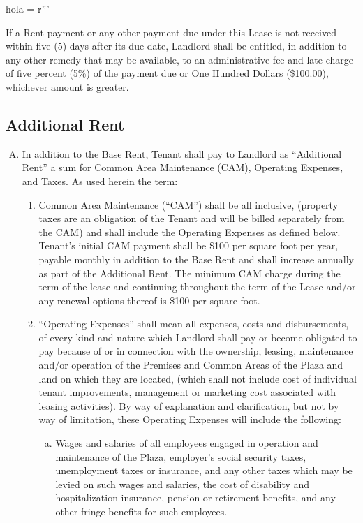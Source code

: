 hola = r'''\documentclass{article}
\newcommand{\cam}{\$100}
\begin{document}
    If a Rent payment or any other payment due under this Lease is not received within five (5) days after its due date, Landlord shall be entitled, in addition to any other remedy that may be available, to an administrative fee and late charge of five percent (5\%) of the payment due or One Hundred Dollars (\$100.00), whichever amount is greater.
    
\subsection*{Additional Rent}

    \begin{enumerate}[(A)]
        \item \label{Subsection 3A}In addition to the Base Rent, Tenant shall pay to Landlord as ``Additional Rent'' a sum for Common Area Maintenance (CAM), Operating Expenses, and Taxes.   As used herein the term:

         \begin{enumerate}[I]
         \item Common Area Maintenance (``CAM'') shall be all inclusive, (property taxes are an obligation of the Tenant and will be billed separately from the CAM) and shall include the Operating Expenses as defined below.  Tenant’s initial CAM payment shall be \cam{} per square foot per year, payable monthly in addition to the Base Rent and shall increase annually as part of the Additional Rent. The minimum CAM charge during the term of the lease and continuing throughout the term of the Lease and/or any renewal options thereof is \cam{} per square foot.

        \item ``Operating Expenses'' shall mean all expenses, costs and disbursements, of every kind and nature which Landlord shall pay or become obligated to pay because of or in connection with the ownership, leasing, maintenance and/or operation of the Premises and Common Areas of the Plaza and land on which they are located, (which shall not include cost of individual tenant improvements, management or marketing cost associated with leasing activities). By way of explanation and clarification, but not by way of limitation, these Operating Expenses will include the following:

        
        \begin{enumerate}[(a)]
        \item Wages and salaries of all employees engaged in operation and maintenance of the Plaza, employer's social security taxes, unemployment taxes or insurance, and any other taxes which may be levied on such wages and salaries, the cost of disability and hospitalization insurance, pension or retirement benefits, and any other fringe benefits for such employees.


\end{enumerate}
\end{enumerate}
\end{enumerate}
\end{document}
